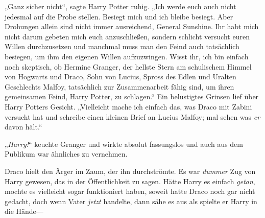 „Ganz sicher nicht“, sagte Harry Potter ruhig. „Ich werde euch auch nicht jedesmal auf die Probe stellen. Besiegt mich und ich bleibe besiegt. Aber Drohungen allein sind nicht immer ausreichend, General Sunshine. Ihr habt mich nicht darum gebeten mich euch anzuschließen, sondern schlicht versucht euren Willen durchzusetzen und manchmal muss man den Feind auch tatsächlich besiegen, um ihm den eigenen Willen aufzuzwingen. Wisst ihr, ich bin einfach noch skeptisch, ob Hermine Granger, der hellste Stern am schulischem Himmel von Hogwarts und Draco, Sohn von Lucius, Spross des Edlen und Uralten Geschlechts Malfoy, tatsächlich zur Zusammenarbeit fähig sind, um ihren gemeinsamen Feind, Harry Potter, zu schlagen.“ Ein belustigtes Grinsen lief über Harry Potters Gesicht. „Vielleicht mache ich einfach das, was Draco mit Zabini versucht hat und schreibe einen kleinen Brief an Lucius Malfoy; mal sehen was \emph{er} davon hält.“

„\emph{Harry!}“ keuchte Granger und wirkte absolut fassungslos und auch aus dem Publikum war ähnliches zu vernehmen.

Draco hielt den Ärger im Zaum, der ihn durchströmte. Es war \emph{dummer} Zug von Harry gewesen, das in der Öffentlichkeit zu sagen. Hätte Harry es einfach \emph{getan}, mochte es vielleicht sogar funktioniert haben, soweit hatte Draco noch gar nicht gedacht, doch wenn Vater \emph{jetzt} handelte, dann sähe es aus als spielte er Harry in die Hände—

